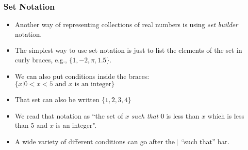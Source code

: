 \documentclass[serif,ignorenonframetext]{beamer}
\begin{document}
\begin{frame}
  \frametitle{Set Notation}
  \begin{itemize}[<+->]
  \item Another way of representing collections of real numbers is using
    \textit{set builder} notation.
  \item The simplest way to use set notation is just to list the elements
    of the set in curly braces, e.g., $\{ 1, -2, \pi, 1.5 \}$.
  \item We can also put conditions inside the braces: \\
    $\{ x | 0<x<5 \mbox{\ and $x$ is an integer} \}$
  \item That set can also be written $\{1, 2, 3, 4\}$
  \item We read that notation as ``the set of $x$ \textit{such that} $0$
    is less than $x$ which is less than $5$ and $x$ is an integer''.
  \item A wide variety of different conditions can go after the $|$ ``such 
    that'' bar.
  \end{itemize}
\end{frame}
\end{document}
